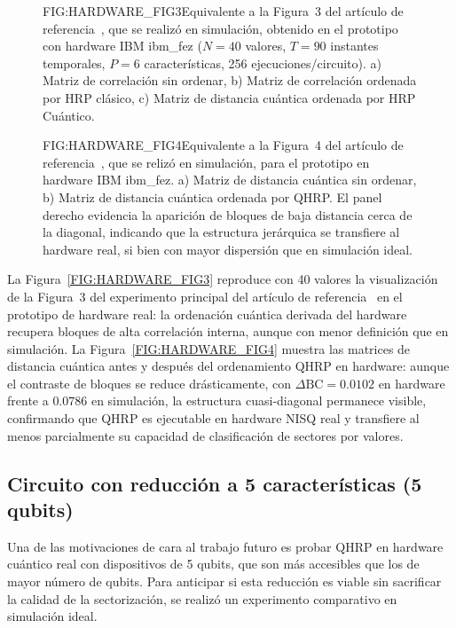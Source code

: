 \begin{figure}[Correlaciones del prototipo en hardware IBM (Fig.\,3)]{FIG:HARDWARE_FIG3}{Equivalente a la Figura~3 del artículo de referencia~\cite{arian2025qhrp}, que se realizó en simulación, obtenido en el prototipo con hardware IBM ibm\_fez (\(N=40\) valores, \(T=90\) instantes temporales, \(P=6\) características, 256 ejecuciones/circuito). a) Matriz de correlación sin ordenar, b) Matriz de correlación ordenada por HRP clásico, c) Matriz de distancia cuántica ordenada por HRP Cuántico.}
\end{figure}

\begin{figure}[Distancias cuánticas del prototipo en hardware IBM (Fig.\,4)]{FIG:HARDWARE_FIG4}{Equivalente a la Figura~4 del artículo de referencia~\cite{arian2025qhrp}, que se relizó en simulación, para el prototipo en hardware IBM ibm\_fez. a) Matriz de distancia cuántica sin ordenar, b) Matriz de distancia cuántica ordenada por QHRP. El panel derecho evidencia la aparición de bloques de baja distancia cerca de la diagonal, indicando que la estructura jerárquica se transfiere al hardware real, si bien con mayor dispersión que en simulación ideal.}
\end{figure}

La Figura~\ref{FIG:HARDWARE_FIG3} reproduce con 40 valores la visualización de la Figura~3 del experimento principal del artículo de referencia~\cite{arian2025qhrp} en el prototipo de hardware real: la ordenación cuántica derivada del hardware recupera bloques de alta correlación interna, aunque con menor definición que en simulación. La Figura~\ref{FIG:HARDWARE_FIG4} muestra las matrices de distancia cuántica antes y después del ordenamiento QHRP en hardware: aunque el contraste de bloques se reduce drásticamente, con $\Delta\mathrm{BC} = 0.0102$ en hardware frente a $0.0786$ en simulación, la estructura cuasi-diagonal permanece visible, confirmando que \gls{QHRP} es ejecutable en hardware \gls{NISQ} real y transfiere al menos parcialmente su capacidad de clasificación de sectores por valores.

\subsection{Circuito con reducción a 5 características (5 qubits)}
\label{subsec:5_qubits}

Una de las motivaciones de cara al trabajo futuro es probar \gls{QHRP} en hardware cuántico real con dispositivos de 5 qubits, que son más accesibles que los de mayor número de qubits. Para anticipar si esta reducción es viable sin sacrificar la calidad de la sectorización, se realizó un experimento comparativo en simulación ideal.

